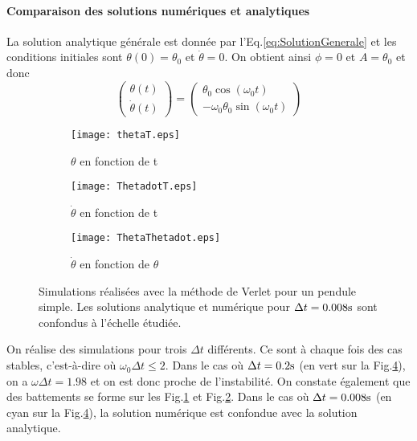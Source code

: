 \documentclass[a4paper,12pt,oneside]{article}
\def \be {\begin{equation}}
\def \ee {\end{equation}}
\def \t {\theta}
\def \vt {\Dot{\theta}}
\begin{document}
\paragraph{Comparaison des solutions numériques et analytiques} %
La solution analytique générale est donnée par l'Eq.\ref{eq:SolutionGenerale} et les conditions initiales sont $\theta(0)=\theta_0$ et $\vt=0$. On obtient ainsi $\phi=0$ et $A=\theta_0$ et donc
\be
 \left(\begin{array}{c} \t (t) \\ \vt (t) \end{array} \right) =
\left(\begin{array}{c} \t_0\cos{(\omega_0 t)} \\ -\omega_0\t_0 \sin{(\omega_0 t)} \end{array} \right)
\ee
\begin{figure}[H]
    \begin{subfigure}[b]{0.5\textwidth}
    \centering
    \texttt{[image: thetaT.eps]}
    \caption{$\theta$ en fonction de t}
    \label{fig:ThetaT}
\end{subfigure}
\begin{subfigure}[b]{0.5\textwidth}
    \texttt{[image: ThetadotT.eps]}
    \caption{$\dot{\theta} $ en fonction de t}
    \label{fig:ÎhetadotTl}
\end{subfigure}
\ContinuedFloat
    \begin{subfigure}[b]{1\textwidth}
    \centering
    \texttt{[image: ThetaThetadot.eps]}
    \caption{$\dot{\theta}$ en fonction de $\theta$}
    \label{fig:ThetaThetadot}
\end{subfigure}
\caption{Simulations réalisées avec la méthode de Verlet pour un pendule simple. Les solutions analytique et numérique pour $\Delta t=0.008\rm{s}$ sont confondus à l'échelle étudiée.}
\label{fig:SimulationsPremierPoint}
\end{figure}
On réalise des simulations pour trois $\Delta t$ différents. Ce sont à chaque fois des cas stables, c'est-à-dire où $\omega_0 \Delta t \leq 2$. Dans le cas où $\Delta t=0.2\rm{s}$ (en vert sur la Fig.\ref{fig:SimulationsPremierPoint}), on a $\omega \Delta t = 1.98$ et on est donc proche de l'instabilité. On constate également que des battements se forme sur les Fig.\ref{fig:ThetaT} et Fig.\ref{fig:ÎhetadotTl}.
Dans le cas où $\Delta t=0.008\rm{s}$ (en cyan sur la Fig.\ref{fig:SimulationsPremierPoint}), la solution numérique est confondue avec la solution analytique.
\end{document}

